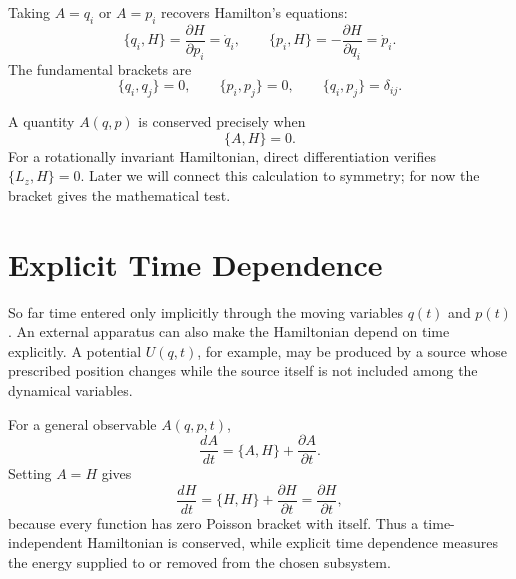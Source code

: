 Taking \(A=q_i\) or \(A=p_i\) recovers Hamilton's equations:
\begin{equation}
 \{q_i,H\}=\frac{\partial H}{\partial p_i}=\dot q_i,
 \qquad
 \{p_i,H\}=-\frac{\partial H}{\partial q_i}=\dot p_i.
 \label{eq:l06-bracket-Hamilton}
\end{equation}
The fundamental brackets are
\begin{equation}
 \{q_i,q_j\}=0,
 \qquad
 \{p_i,p_j\}=0,
 \qquad
 \{q_i,p_j\}=\delta_{ij}.
 \label{eq:l06-canonical-brackets}
\end{equation}

A quantity \(A(q,p)\) is conserved precisely when
\begin{equation}
 \boxed{\{A,H\}=0.}
 \label{eq:l06-conservation-bracket}
\end{equation}
For a rotationally invariant Hamiltonian, direct differentiation verifies
\(\{L_z,H\}=0\). Later we will connect this calculation to symmetry; for now
the bracket gives the mathematical test.

\begin{classroomqa}
\end{classroomqa}

\section{Explicit Time Dependence}

So far time entered only implicitly through the moving variables \(q(t)\)
and \(p(t)\). An external apparatus can also make the Hamiltonian depend on time
explicitly. A potential \(U(q,t)\), for example, may be produced by a source
whose prescribed position changes while the source itself is not included
among the dynamical variables.

For a general observable \(A(q,p,t)\),
\begin{equation}
 \frac{dA}{dt}=\{A,H\}+\frac{\partial A}{\partial t}.
 \label{eq:l06-explicit-A}
\end{equation}
Setting \(A=H\) gives
\begin{equation}
 \frac{dH}{dt}
 =\{H,H\}+\frac{\partial H}{\partial t}
 =\boxed{\frac{\partial H}{\partial t}},
 \label{eq:l06-explicit-H}
\end{equation}
because every function has zero Poisson bracket with itself. Thus a
time-independent Hamiltonian is conserved, while explicit time dependence
measures the energy supplied to or removed from the chosen subsystem.

